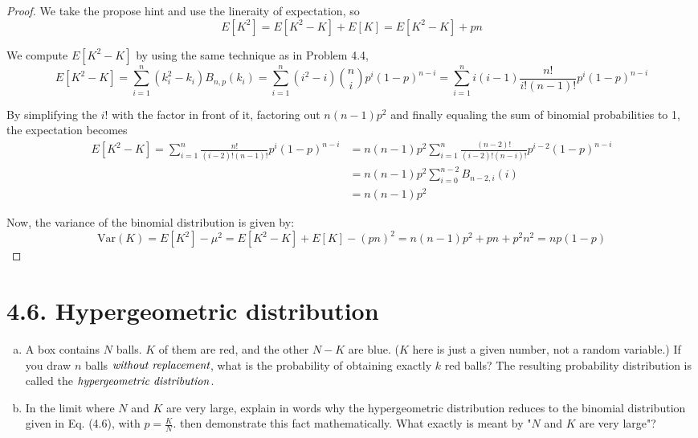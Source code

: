 \begin{proof}
    We take the propose hint and use the lineraity of expectation, so
    \[
        E[K^2] = E[K^2 - K] + E[K] = E[K^2 - K] + pn
    \] 

    We compute $E[K^2 - K]$ by using the same technique as in Problem 4.4,
    \[
        E[K^2 - K] = \sum_{i = 1}^n (k_i^2 - k_i) B_{n, p}(k_i) 
        = \sum_{i = 1}^n (i^2 - i) \binom{n}{i} p^i (1 - p)^{n - i}
        = \sum_{i = 1}^n i(i - 1) \frac{n!}{i! (n - 1)!}p^i (1-p)^{n - i}
    \] 

    By simplifying the $i!$ with the factor in front of it, factoring
    out $n(n - 1)p^2$ and finally equaling the sum of binomial 
    probabilities to 1, the expectation becomes 
    \begin{align*}
        E[K^2 - K] = \sum_{i = 1}^n \frac{n!}{(i - 2)! (n - 1)!}p^i (1-p)^{n - i}
        &= n(n - 1)p^2 \sum_{i = 1}^n \frac{(n - 2)!}{(i - 2)!(n - i)!}p^{i - 2}(1 - p)^{n - i} \\
        &= n(n - 1)p^2\sum_{i = 0}^{n - 2} B_{n - 2, i}(i) \\
        &= n(n - 1)p^2
    \end{align*}

    Now, the variance of the binomial distribution is given by:
    \[
        \text{Var}(K) = E[K^2] - \mu^2 = E[K^2 - K] + E[K] - (pn)^2
        = n(n - 1)p^2 + pn + p^2n^2 = np(1 - p)
    \] 
\end{proof}

\section*{4.6. Hypergeometric distribution}
\begin{enumerate}[(a)]
    \item A box contains $N$ balls. $K$ of them are red, and the other $N - K$
        are blue. ($K$ here is just a given number, not a random variable.) 
        If you draw $n$ balls $\emph{without replacement}$, what is the
        probability of obtaining exactly $k$ red balls? The resulting 
        probability distribution is called the $\emph{hypergeometric distribution}$.
    
    \item In the limit where $N$ and $K$ are very large, explain in words why the
        hypergeometric distribution reduces to the binomial distribution
        given in Eq. (4.6), with $p = \frac{K}{N}$. then demonstrate this fact
        mathematically. What exactly is meant by "$N$ and $K$ are very large"?
\end{enumerate}

